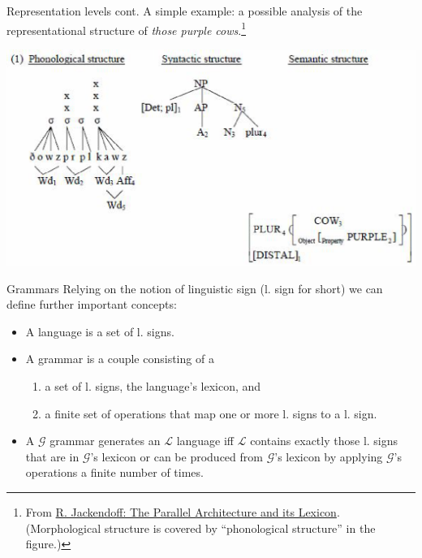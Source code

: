 \documentclass[style=upen, size=14pt]{powerdot}
\newcommand{\gold}{\color{arany}}
\begin{document}
\begin{slide}[toc=]{Representation levels cont.}
  A simple example: a possible analysis of the representational structure of
  \emph{those purple cows}.\footnote{From
    \href{http://web.stanford.edu/group/cslipublications/cslipublications/LFG/15/abstracts/lfg10abs-jackedoff.html}{R.
      Jackendoff: The Parallel Architecture and its Lexicon}. (Morphological
    structure is covered by ``phonological structure'' in the figure.)}
  
  \includegraphics[width=1.\textwidth]{jackendoff_diagram.eps}
\end{slide}

\begin{slide}[toc=Grammars]{Grammars}
  Relying on the notion of linguistic sign (l. sign for short) we can define
  further important concepts:
  \begin{itemize}
  \item A {\gold language} is a set of l. signs.
  \item A {\gold grammar} is a couple consisting of a
  \begin{enumerate}
  \item a set of l. signs, the language's {\gold lexicon}, and
  \item a finite set of operations that map one or more l. signs to a l. sign.
  \end{enumerate}
\item 
  A $\mathcal G$ grammar {\gold generates} an $\mathcal L$
  language iff $\mathcal L$ contains exactly those l. signs that are in
  $\mathcal G$'s lexicon or can be produced from $\mathcal G$'s lexicon by
  applying $\mathcal G$'s operations a finite number of times.
\end{itemize}
\end{slide}
\end{document}
